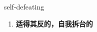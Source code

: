 
\begin{frame}
{\huge self-defeating}
\begin{center}
\begin{enumerate}\Large
  \item \textbf{适得其反的，自我拆台的}
\end{enumerate}
\end{center}
\end{frame}
